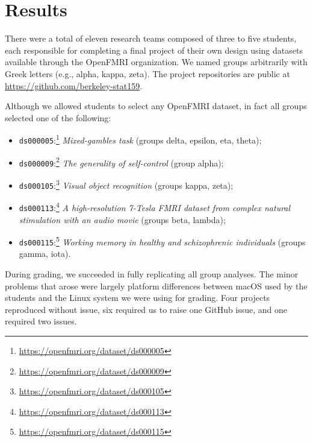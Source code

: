 \section{Results}\label{results}

There were a total of eleven research teams composed of three to five
students, each responsible for completing a final project of their own design
using datasets available through the OpenFMRI organization.  We named groups
arbitrarily with Greek letters (e.g., alpha, kappa, zeta).  The project
repositories are public at \url{https://github.com/berkeley-stat159}.

Although we allowed students to select any OpenFMRI dataset, in fact all
groups selected one of the following:

\begin{itemize}

\item
    \texttt{ds000005}:\footnote{\url{https://openfmri.org/dataset/ds000005}}
        \textit{Mixed-gambles task} \citep{tom2007neural} (groups delta,
        epsilon, eta, theta);

\item
    \texttt{ds000009}:\footnote{\url{https://openfmri.org/dataset/ds000009}}
        \textit{The generality of self-control} \citep{cohen2014generality}
        (group alpha);

\item
    \texttt{ds000105}:\footnote{\url{https://openfmri.org/dataset/ds000105}}
        \textit{Visual object recognition} \citep{haxby2001distributed}
        (groups kappa, zeta);

\item
    \texttt{ds000113}:\footnote{\url{https://openfmri.org/dataset/ds000113}}
        \textit{A high-resolution 7-Tesla FMRI dataset from complex natural
        stimulation with an audio movie} \citep{hanke2014high} (groups beta,
        lambda);

\item
    \texttt{ds000115}:\footnote{\url{https://openfmri.org/dataset/ds000115}}
        \textit{Working memory in healthy and schizophrenic individuals}
        \citep{repovs2012working} (groups gamma, iota).

\end{itemize}

During grading, we succeeded in fully replicating all group analyses.  The
minor problems that arose were largely platform differences between macOS used
by the students and the Linux system we were using for grading.  Four projects
reproduced without issue, six required us to raise one GitHub issue, and one
required two issues.

